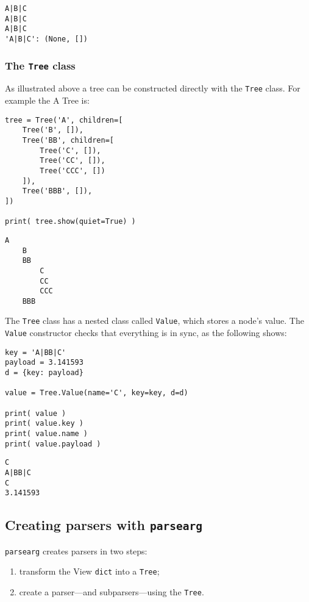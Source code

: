 \documentclass[10pt]{amsart}
\numberwithin{equation}{section}
\begin{document}
\begin{verbatim}
A|B|C
A|B|C
A|B|C
'A|B|C': (None, [])
\end{verbatim}

\subsubsection{The \texttt{Tree} class}
\label{sec:orgf8a9b18}
As illustrated above a tree can be constructed directly with the \texttt{Tree} class.
For example the A Tree is:
\begin{verbatim}
tree = Tree('A', children=[
    Tree('B', []),
    Tree('BB', children=[
        Tree('C', []),
        Tree('CC', []),
        Tree('CCC', [])
    ]),
    Tree('BBB', []),
])

print( tree.show(quiet=True) )
\end{verbatim}

\begin{verbatim}
A
    B
    BB
        C
        CC
        CCC
    BBB
\end{verbatim}


The \texttt{Tree} class has a nested class called \texttt{Value}, which stores a node's value.
The \texttt{Value} constructor checks that everything is in sync, as the following shows:
\begin{verbatim}
key = 'A|BB|C'
payload = 3.141593
d = {key: payload}

value = Tree.Value(name='C', key=key, d=d)

print( value )
print( value.key )
print( value.name )
print( value.payload )
\end{verbatim}

\begin{verbatim}
C
A|BB|C
C
3.141593
\end{verbatim}

\subsection{Creating parsers with \texttt{parsearg}}
\label{sec:org4cd2a90}
\texttt{parsearg} creates parsers in two steps:

\begin{enumerate}
\item transform the View \texttt{dict} into a \texttt{Tree};
\item create a parser---and subparsers---using the \texttt{Tree}.
\end{enumerate}
\end{document}
